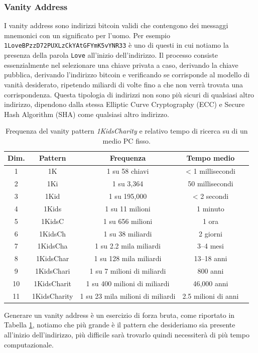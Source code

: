 \subsubsection{Vanity Address}
I vanity address sono indirizzi bitcoin validi che contengono dei messaggi mnemonici con un significato per l'uomo. Per esempio \texttt{1LoveBPzzD72PUXLzCkYAtGFYmK5vYNR33} è uno di questi in cui notiamo la presenza della parola \texttt{Love} all'inizio dell'indirizzo. Il processo consiste essenzialmente nel selezionare una chiave privata a caso, derivando la chiave pubblica, derivando l'indirizzo bitcoin e verificando se corrisponde al modello di vanità desiderato, ripetendo miliardi di volte fino a che non verrà trovata una corrispondenza. Questa tipologia di indirizzi non sono più sicuri di qualsiasi altro indirizzo, dipendono dalla stessa Elliptic Curve Cryptography (ECC) e Secure Hash Algorithm (SHA) come qualsiasi altro indirizzo.
\begin{table}[]
	\centering
	\begin{tabular}{|c|c|c|c|c|}
		\hline
		\textbf{Dim.} 	& \textbf{Pattern} 	& \textbf{Frequenza} 		& \textbf{Tempo medio} \\ \hline
		1 			& 1K 		& 1 su 58 chiavi 	& < 1 millisecondi \\ \hline
		2 			& 1Ki 		& 1 su 3,364 		& 50 millisecondi \\ \hline
		3 			& 1Kid 		& 1 su 195,000 		& < 2 secondi \\ \hline
		4 			& 1Kids 	& 1 su 11 milioni 	& 1 minuto \\ \hline
		5 			& 1KidsC 	& 1 su 656 milioni 	& 1 ora \\ \hline
		6 			& 1KidsCh 	& 1 su 38 miliardi 	& 2 giorni \\ \hline
		7 			& 1KidsCha 	& 1 su 2.2 mila miliardi 	& 3–4 mesi \\ \hline
		8 			& 1KidsChar & 1 su 128 mila miliardi 	& 13–18 anni \\ \hline
		9 			& 1KidsChari 	& 1 su 7 milioni di miliardi	& 800 anni \\ \hline
		10 			& 1KidsCharit 	& 1 su 400 milioni di miliardi	& 46,000 anni \\ \hline
		11 			& 1KidsCharity 	& 1 su 23 mila milioni di miliardi	& 2.5 milioni di anni \\ \hline
	\end{tabular}
	\caption{Frequenza del vanity pattern \textit{1KidsCharity} e relativo tempo di ricerca su di un medio PC fisso.}
	\label{tab:vanity-address-table}
\end{table}
Generare un vanity address è un esercizio di forza bruta, come riportato in Tabella \ref{tab:vanity-address-table}, notiamo che più grande è il pattern che desideriamo sia presente all'inizio dell'indirizzo, più difficile sarà trovarlo quindi necessiterà di più tempo computazionale. 

